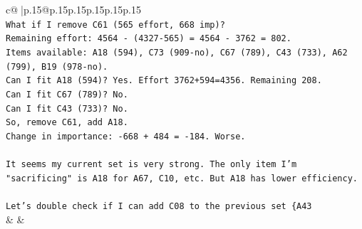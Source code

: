 \documentclass{article}
\begin{document}
{\begin{supertabular}{c@{$\;$}|p{.15\linewidth}@{}p{.15\linewidth}p{.15\linewidth}p{.15\linewidth}p{.15\linewidth}p{.15\linewidth}}
{{{\\ 
\texttt{What if I remove C61 (565 effort, 668 imp)?} \\
\texttt{Remaining effort: 4564 {-} (4327{-}565) = 4564 {-} 3762 = 802.} \\
\texttt{Items available: A18 (594), C73 (909{-}no), C67 (789), C43 (733), A62 (799), B19 (978{-}no).} \\
\texttt{Can I fit A18 (594)? Yes. Effort 3762+594=4356. Remaining 208.} \\
\texttt{Can I fit C67 (789)? No.} \\
\texttt{Can I fit C43 (733)? No.} \\
\texttt{So, remove C61, add A18.} \\
\texttt{Change in importance: {-}668 + 484 = {-}184. Worse.} \\
\\ 
\texttt{It seems my current set is very strong. The only item I'm "sacrificing" is A18 for A67, C10, etc. But A18 has lower efficiency.} \\
\\ 
\texttt{Let's double check if I can add C08 to the previous set \{A43} \\
            }
        }
    }
    & & \\ \\


\end{supertabular}}
\end{document}
